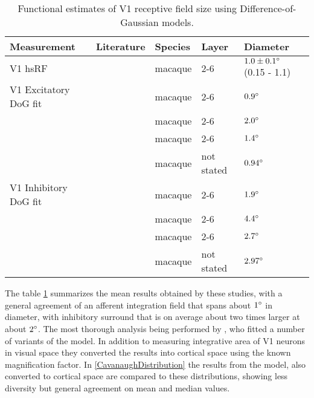 \begin{table}
  \centering
  \begin{adjustbox}{width=1\textwidth}
  \begin{tabular}{l | l l l l}
    Measurement              & Literature            & Species & Layer & Diameter \\
    \hline
    V1 hsRF                  & \cite{Levitt2002}     & macaque & 2-6 & $1.0 \pm 0.1\degree$ (0.15 - 1.1) \\
    \hline
    V1 Excitatory DoG fit    & \cite{Levitt2002}     & macaque & 2-6 & $0.9\degree$ \\
                             & \cite{Sceniak2001}    & macaque & 2-6 & $2.0\degree$ \\
                             & \cite{Cavanaugh2002}  & macaque & 2-6 & $1.4\degree$ \\
                             & \cite{Solomon2002}    & macaque & not stated & $0.94\degree$ \\
    \hline
    V1 Inhibitory DoG fit    & \cite{Levitt2002}     & macaque & 2-6 & $1.9\degree$ \\
                             & \cite{Sceniak2001}    & macaque & 2-6 & $4.4\degree$ \\
                             & \cite{Cavanaugh2002}  & macaque & 2-6 & $2.7\degree$ \\
                             & \cite{Solomon2002}    & macaque & not stated & $2.97\degree$ \\
    \hline
  \end{tabular}
  \end{adjustbox}
  \caption{Functional estimates of V1 receptive field size using
    Difference-of-Gaussian models.}
  \label{electrophystable}
\end{table}

The table \ref{electrophystable} summarizes the mean results obtained
by these studies, with a general agreement of an afferent integration
field that spans about $1\degree$ in diameter, with inhibitory
surround that is on average about two times larger at about 
$2\degree$. The most thorough analysis being performed by
\cite{Cavanaugh2002}, who fitted a number of variants of the model. In
addition to measuring integrative area of V1 neurons in visual space
they converted the results into cortical space using the known
magnification factor. In \ref{CavanaughDistribution} the results from
the model, also converted to cortical space are compared to these
distributions, showing less diversity but general agreement on mean
and median values.

